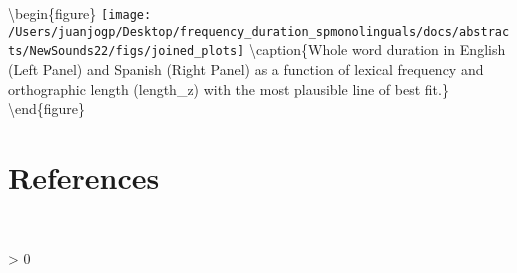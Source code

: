 \documentclass[
  12pt,
]{article}
\newlength{\cslhangindent}
\newenvironment{CSLReferences}[2] %
 {%
  \setlength{\parindent}{0pt}
  \ifodd #1 \everypar{\setlength{\hangindent}{\cslhangindent}}\ignorespaces\fi
  \ifnum #2 > 0
  \setlength{\parskip}{#2\baselineskip}
  \fi
 }%
 {}
\begin{document}
\clearpage

\textbackslash begin\{figure\}
\texttt{[image: /Users/juanjogp/Desktop/frequency\_duration\_spmonolinguals/docs/abstracts/NewSounds22/figs/joined\_plots]}
\textbackslash caption\{Whole word duration in English (Left Panel) and
Spanish (Right Panel) as a function of lexical frequency and
orthographic length (length\_z) with the most plausible line of best
fit.\}\label{fig:plot-eng} \textbackslash end\{figure\}

\hypertarget{references}{%
\section{References}\label{references}}

\begingroup
\setlength{\parindent}{-0.5in}
\setlength{\leftskip}{0.5in}

\phantom{.}

\textcolor{white}{\\} \vspace{-0.5in}

\hypertarget{refs}{}
\begin{CSLReferences}{0}{0}
\end{CSLReferences}

\endgroup
\end{document}
